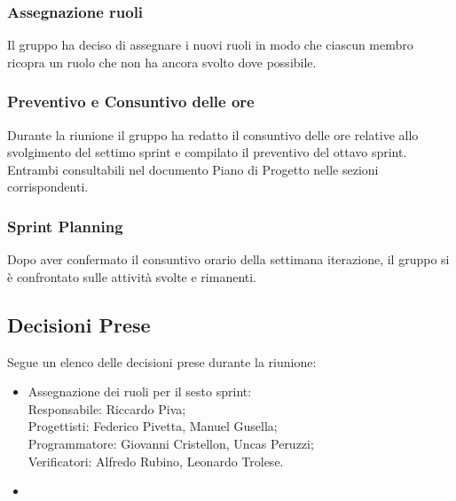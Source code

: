 \documentclass[10pt]{article}
\begin{document}
\subsubsection{Assegnazione ruoli}
Il gruppo ha deciso di assegnare i nuovi ruoli in modo che ciascun membro ricopra un ruolo che non ha ancora svolto dove possibile.

\subsubsection{Preventivo e Consuntivo delle ore}
Durante la riunione il gruppo ha redatto il consuntivo delle ore relative allo svolgimento del settimo sprint e compilato il preventivo del ottavo sprint. Entrambi consultabili nel documento Piano di Progetto nelle sezioni corrispondenti.\\

\subsubsection{Sprint Planning}
Dopo aver confermato il consuntivo orario della settimana iterazione, il gruppo si è confrontato sulle attività svolte e rimanenti.


\subsection{Decisioni Prese}
Segue un elenco delle decisioni prese durante la riunione:
\begin{itemize}
    \item   Assegnazione dei ruoli per il sesto sprint:\\
            Responsabile: Riccardo Piva;\\
            Progettisti: Federico Pivetta, Manuel Gusella;\\
            Programmatore: Giovanni Cristellon, Uncas Peruzzi;\\
            Verificatori: Alfredo Rubino, Leonardo Trolese.
    \item
\end{itemize}
\end{document}

